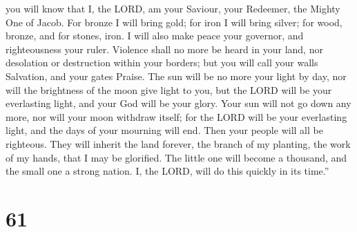 you will know that I, the LORD, am your Saviour, your Redeemer, the
Mighty One of Jacob.  For bronze I will bring gold; for
iron I will bring silver; for wood, bronze, and for stones, iron. I will
also make peace your governor, and righteousness your ruler.
 Violence shall no more be heard in your land, nor
desolation or destruction within your borders; but you will call your
walls Salvation, and your gates Praise.  The sun will be
no more your light by day, nor will the brightness of the moon give
light to you, but the LORD will be your everlasting light, and your God
will be your glory.  Your sun will not go down any more,
nor will your moon withdraw itself; for the LORD will be your
everlasting light, and the days of your mourning will end.
 Then your people will all be righteous. They will
inherit the land forever, the branch of my planting, the work of my
hands, that I may be glorified.  The little one will
become a thousand, and the small one a strong nation. I, the LORD, will
do this quickly in its time.''

\hypertarget{section-58}{%
\section{61}\label{section-58}}

